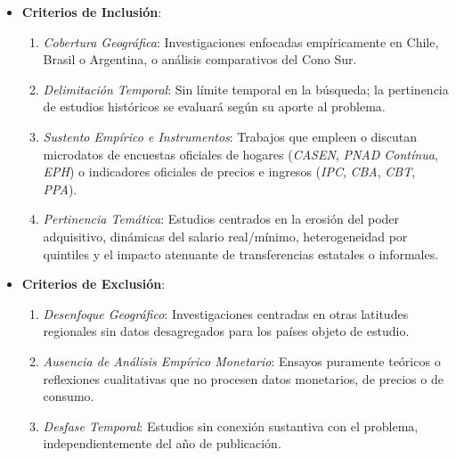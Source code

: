 \begin{itemize}
    \item \textbf{Criterios de Inclusión}:
    \begin{enumerate}
        \item \textit{Cobertura Geográfica}: Investigaciones enfocadas empíricamente en Chile, Brasil o Argentina, o análisis comparativos del Cono Sur.
        \item \textit{Delimitación Temporal}: Sin límite temporal en la búsqueda; la pertinencia de estudios históricos se evaluará según su aporte al problema.
        \item \textit{Sustento Empírico e Instrumentos}: Trabajos que empleen o discutan microdatos de encuestas oficiales de hogares (\textit{CASEN}, \textit{PNAD Contínua}, \textit{EPH}) o indicadores oficiales de precios e ingresos (\textit{IPC}, \textit{CBA}, \textit{CBT}, \textit{PPA}).
        \item \textit{Pertinencia Temática}: Estudios centrados en la erosión del poder adquisitivo, dinámicas del salario real/mínimo, heterogeneidad por quintiles y el impacto atenuante de transferencias estatales o informales.
    \end{enumerate}

    \item \textbf{Criterios de Exclusión}:
    \begin{enumerate}
        \item \textit{Desenfoque Geográfico}: Investigaciones centradas en otras latitudes regionales sin datos desagregados para los países objeto de estudio.
        \item \textit{Ausencia de Análisis Empírico Monetario}: Ensayos puramente teóricos o reflexiones cualitativas que no procesen datos monetarios, de precios o de consumo.
        \item \textit{Desfase Temporal}: Estudios sin conexión sustantiva con el problema, independientemente del año de publicación.
    \end{enumerate}
\end{itemize}

